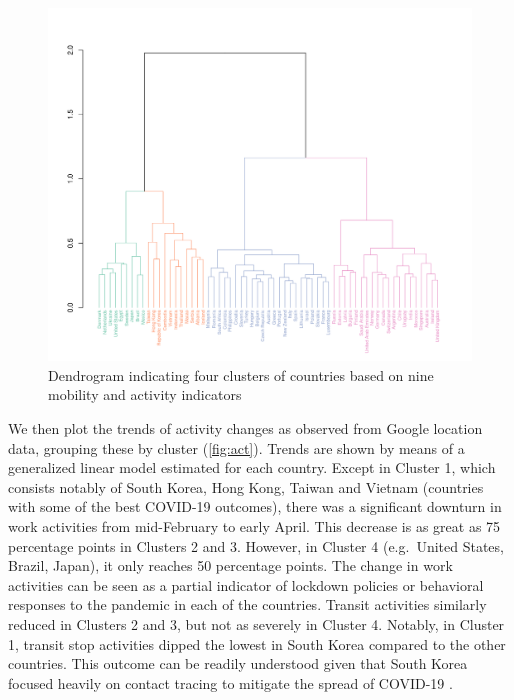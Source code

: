 \documentclass[preprint, 12pt]{elsarticle}
\newcommand{\?}{\stackrel{?}{=}}
\begin{document}
\begin{figure}[h!]
  \includegraphics[width=\textwidth,trim={0cm 0 1.9cm 7cm},clip]{dendrogram}
  \caption{Dendrogram indicating four clusters of countries based on nine mobility and activity indicators}
  \label{fig:dend}
\end{figure}

We then plot the trends of activity changes as observed from Google location data, grouping these by cluster (\autoref{fig:act}).
Trends are shown by means of a generalized linear model estimated for each country.
Except in Cluster 1, which consists notably of South Korea, Hong Kong, Taiwan and Vietnam (countries with some of the best COVID-19 outcomes),
there was a significant downturn in work activities from mid-February to early April.
This decrease is as great as 75 percentage points in Clusters 2 and 3.
However, in Cluster 4 (e.g.\ United States, Brazil, Japan), it only reaches 50 percentage points.
The change in work activities can be seen as a partial indicator of lockdown policies or behavioral responses to the pandemic in each of the countries.
Transit activities similarly reduced in Clusters 2 and 3, but not as severely in Cluster 4.
Notably, in Cluster 1, transit stop activities dipped the lowest in South Korea compared to the other countries.
This outcome can be readily understood given that South Korea focused heavily on contact tracing to mitigate the spread of COVID-19 \cite{aum2020covid19,parkearly}.
\end{document}
